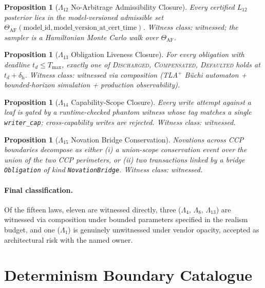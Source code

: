 \documentclass[11pt,a4paper]{article}
\newtheorem{proposition}[definition]{Proposition}
\begin{document}
\begin{proposition}[$\Lambda_{12}$ No-Arbitrage Admissibility Closure]
\label{prop:lambda12}
Every certified $L_{12}$ posterior lies in the model-versioned admissible set $\Theta_{\mathrm{AF}}(\text{model\_id}, \text{model\_version\_at\_cert\_time})$. Witness class: \emph{witnessed}; the sampler is a Hamiltonian Monte Carlo walk over $\Theta_{\mathrm{AF}}$.
\end{proposition}

\begin{proposition}[$\Lambda_{13}$ Obligation Liveness Closure]
\label{prop:lambda13}
For every obligation with deadline $t_d \le T_{\max}$, exactly one of \textsc{Discharged}, \textsc{Compensated}, \textsc{Defaulted} holds at $t_d + \delta_{\mathrm{h}}$. Witness class: \emph{witnessed via composition} (TLA$^+$ B\"uchi automaton + bounded-horizon simulation + production observability).
\end{proposition}

\begin{proposition}[$\Lambda_{14}$ Capability-Scope Closure]
\label{prop:lambda14}
Every write attempt against a leaf is gated by a runtime-checked phantom witness whose tag matches a single \texttt{writer\_cap}; cross-capability writes are rejected. Witness class: \emph{witnessed}.
\end{proposition}

\begin{proposition}[$\Lambda_{15}$ Novation Bridge Conservation]
\label{prop:lambda15}
Novations across CCP boundaries decompose as either (i) a union-scope conservation event over the union of the two CCP perimeters, or (ii) two transactions linked by a bridge \texttt{Obligation} of kind \texttt{NovationBridge}. Witness class: \emph{witnessed}.
\end{proposition}

\paragraph{Final classification.} Of the fifteen laws, eleven are witnessed directly, three ($\Lambda_4$, $\Lambda_8$, $\Lambda_{13}$) are witnessed via composition under bounded parameters specified in the realism budget, and one ($\Lambda_1$) is genuinely unwitnessed under vendor opacity, accepted as architectural risk with the named owner.

\clearpage
\section{Determinism Boundary Catalogue}
\label{sec:boundaries}
\end{document}
